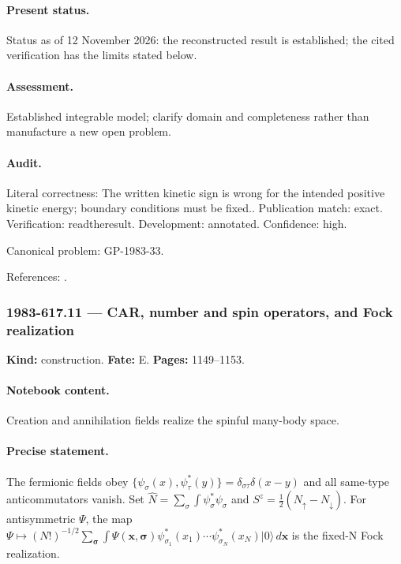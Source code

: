 \paragraph{Present status.} Status as of 12 November 2026: the reconstructed result is established; the cited verification has the limits stated below.

\paragraph{Assessment.} Established integrable model; clarify domain and completeness rather than manufacture a new open problem.

\paragraph{Audit.} Literal correctness: The written kinetic sign is wrong for the intended positive kinetic energy; boundary conditions must be fixed.. Publication match: exact. Verification: readtheresult. Development: annotated. Confidence: high.

\noindent Canonical problem: GP-1983-33.\par

\noindent References: \citep{yang1967manybody,yang1968smatrix}.\par

\subsubsection{1983-617.11 --- CAR, number and spin operators, and Fock realization}

\label{item:1983-617.11}

\noindent\textbf{Kind:} construction. \textbf{Fate:} E. \textbf{Pages:} 1149--1153.\par

\paragraph{Notebook content.} Creation and annihilation fields realize the spinful many-body space.

\paragraph{Precise statement.} The fermionic fields obey $\{\psi_\sigma(x),\psi_\tau^*(y)\}=\delta_{\sigma\tau}\delta(x-y)$ and all same-type anticommutators vanish. Set $\widehat N=\sum_\sigma\int\psi_\sigma^*\psi_\sigma$ and $S^z=\frac12(N_\uparrow-N_\downarrow)$. For antisymmetric $\Psi$, the map $\Psi\mapsto(N!)^{-1/2}\sum_{\boldsymbol\sigma}\int\Psi(\boldsymbol x,\boldsymbol\sigma)\psi_{\sigma_1}^*(x_1)\cdots\psi_{\sigma_N}^*(x_N)|0\rangle\,d\boldsymbol x$ is the fixed-N Fock realization.

